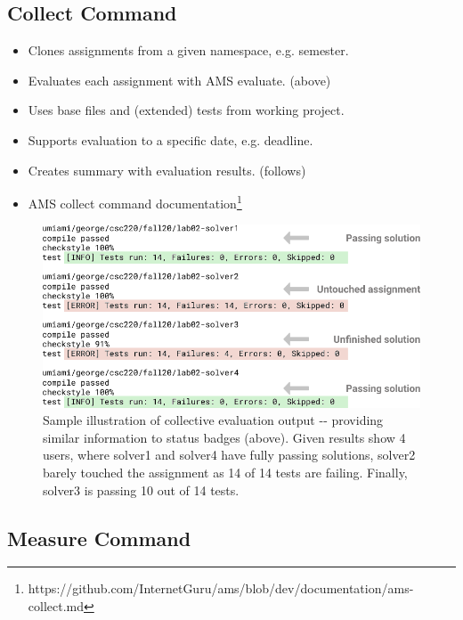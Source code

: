\subsection{Collect Command}\label{ssec:collectcmd}

\begin{itemize}
\item
  {Clones assignments from a given namespace, e.g. semester.}
\item
  {Evaluates each assignment with AMS evaluate. (above)}
\item
  {Uses base files and (extended) tests from working project.}
\item
  {Supports evaluation to a specific date, e.g. deadline.}
\item
  {Creates summary with evaluation results. (follows)}
\item
  {AMS collect command documentation\footnote{https://github.com/InternetGuru/ams/blob/dev/documentation/ams-collect.md}}
\end{itemize}

\begin{figure}[H]
    \centering
    \includegraphics[width=\textwidth,height=\textheight,keepaspectratio]{Figures/impl/image2.png}
    \caption[Collective evaluation output example]{Sample illustration of collective evaluation output -\/- providing similar information to status badges (above). Given results show 4 users, where solver1 and solver4 have fully passing solutions, solver2 barely touched the assignment as 14 of 14 tests are failing. Finally, solver3 is passing 10 out of 14 tests.}
\end{figure}

\subsection{Measure Command}\label{ssec:measurecmd}

